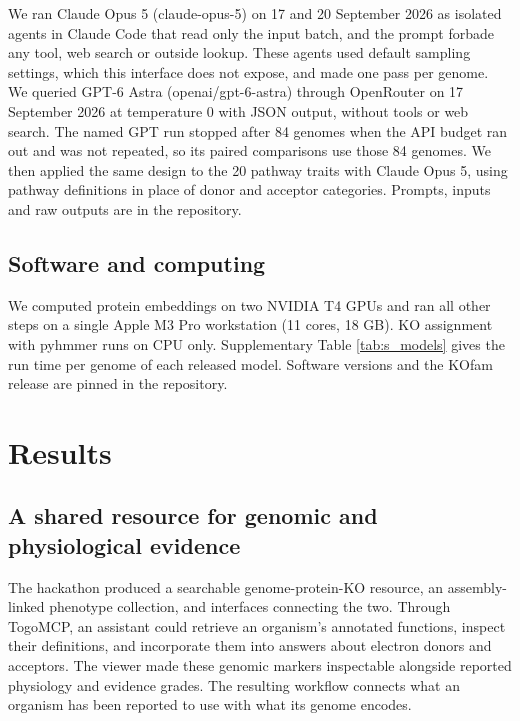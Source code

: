 \documentclass[10pt,a4paper,onecolumn]{article}
\begin{document}
We ran Claude Opus 5 (claude-opus-5) on 17 and 20 September 2026 as
isolated agents in Claude Code that read only the input batch, and the
prompt forbade any tool, web search or outside lookup. These agents used
default sampling settings, which this interface does not expose, and
made one pass per genome. We queried GPT-6 Astra (openai/gpt-6-astra)
through OpenRouter on 17 September 2026 at temperature 0 with JSON
output, without tools or web search. The named GPT run stopped after 84
genomes when the API budget ran out and was not repeated, so its paired
comparisons use those 84 genomes. We then applied the same design to the
20 pathway traits with Claude Opus 5, using pathway definitions in place
of donor and acceptor categories. Prompts, inputs and raw outputs are in
the repository.

\subsection{Software and computing}\label{software-and-computing}

We computed protein embeddings on two NVIDIA T4 GPUs and ran all other
steps on a single Apple M3 Pro workstation (11 cores, 18 GB). KO
assignment with pyhmmer runs on CPU only. Supplementary Table
\ref{tab:s_models} gives the run time per genome of each released model.
Software versions and the KOfam release are pinned in the repository.

\section{Results}\label{results}

\subsection{A shared resource for genomic and physiological
evidence}\label{a-shared-resource-for-genomic-and-physiological-evidence}

The hackathon produced a searchable genome-protein-KO resource, an
assembly-linked phenotype collection, and interfaces connecting the two.
Through TogoMCP, an assistant could retrieve an organism's annotated
functions, inspect their definitions, and incorporate them into answers
about electron donors and acceptors. The viewer made these genomic
markers inspectable alongside reported physiology and evidence grades.
The resulting workflow connects what an organism has been reported to
use with what its genome encodes.
\end{document}

